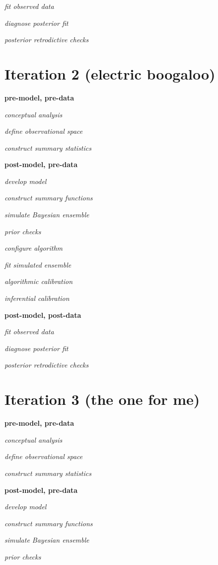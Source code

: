 \documentclass[11pt, oneside, openany]{scrbook}
\begin{document}
\emph{fit observed data}

\emph{diagnose posterior fit}

\emph{posterior retrodictive checks}

\hypertarget{iter2}{%
\section{Iteration 2 (electric boogaloo)}\label{iter2}}

\textbf{pre-model, pre-data}

\emph{conceptual analysis}

\emph{define observational space}

\emph{construct summary statistics}

\textbf{post-model, pre-data}

\emph{develop model}

\emph{construct summary functions}

\emph{simulate Bayesian ensemble}

\emph{prior checks}

\emph{configure algorithm}

\emph{fit simulated ensemble}

\emph{algorithmic calibration}

\emph{inferential calibration}

\textbf{post-model, post-data}

\emph{fit observed data}

\emph{diagnose posterior fit}

\emph{posterior retrodictive checks}

\hypertarget{iter3}{%
\section{Iteration 3 (the one for me)}\label{iter3}}

\textbf{pre-model, pre-data}

\emph{conceptual analysis}

\emph{define observational space}

\emph{construct summary statistics}

\textbf{post-model, pre-data}

\emph{develop model}

\emph{construct summary functions}

\emph{simulate Bayesian ensemble}

\emph{prior checks}
\end{document}
